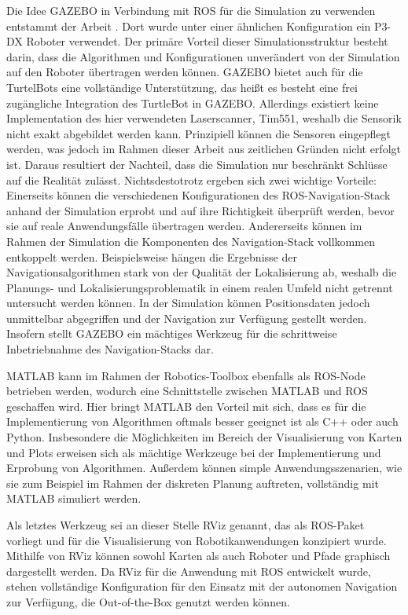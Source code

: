 Die Idee GAZEBO in Verbindung mit ROS für die Simulation zu verwenden entstammt der Arbeit \cite{ROSGazebo}. Dort wurde unter einer ähnlichen Konfiguration ein P3-DX Roboter verwendet. Der primäre Vorteil dieser Simulationsstruktur besteht darin, dass die Algorithmen und Konfigurationen unverändert von der Simulation auf den Roboter übertragen werden können. GAZEBO bietet auch für die TurtelBots eine vollständige Unterstützung, das heißt es besteht eine frei zugängliche Integration des TurtleBot in GAZEBO. Allerdings existiert keine Implementation des hier verwendeten Laserscanner, Tim551, weshalb die Sensorik nicht exakt abgebildet werden kann. Prinzipiell können die Sensoren eingepflegt werden, was jedoch im Rahmen dieser Arbeit aus zeitlichen Gründen nicht erfolgt ist. Daraus resultiert der Nachteil, dass die Simulation nur beschränkt Schlüsse auf die Realität zulässt. Nichtsdestotrotz ergeben sich zwei wichtige Vorteile: Einerseits können die verschiedenen Konfigurationen des ROS-Navigation-Stack anhand der Simulation erprobt und auf ihre Richtigkeit überprüft werden, bevor sie auf reale Anwendungsfälle übertragen werden. Andererseits können im Rahmen der Simulation die Komponenten des Navigation-Stack vollkommen entkoppelt werden. Beispielsweise hängen die Ergebnisse der Navigationsalgorithmen stark von der Qualität der Lokalisierung ab, weshalb die Planungs- und Lokalisierungsproblematik in einem realen Umfeld nicht getrennt untersucht werden können. In der Simulation können Positionsdaten jedoch unmittelbar abgegriffen und der Navigation zur Verfügung gestellt werden. Insofern stellt GAZEBO ein mächtiges Werkzeug für die schrittweise Inbetriebnahme des Navigation-Stacks dar.

MATLAB kann im Rahmen der Robotics-Toolbox ebenfalls als ROS-Node betrieben werden, wodurch eine Schnittstelle zwischen MATLAB und ROS geschaffen wird. Hier bringt MATLAB den Vorteil mit sich, dass es für die Implementierung von Algorithmen oftmals besser geeignet ist als C++ oder auch Python. Insbesondere die Möglichkeiten im Bereich der Visualisierung von Karten und Plots erweisen sich als mächtige Werkzeuge bei der Implementierung und Erprobung von Algorithmen. Außerdem können simple Anwendungsszenarien, wie sie zum Beispiel im Rahmen der diskreten Planung auftreten, vollständig mit MATLAB simuliert werden.

Als letztes Werkzeug sei an dieser Stelle RViz genannt, das als ROS-Paket vorliegt und für die Visualisierung von Robotikanwendungen konzipiert wurde. Mithilfe von RViz können sowohl Karten als auch Roboter und Pfade graphisch dargestellt werden. Da RViz für die Anwendung mit ROS entwickelt wurde, stehen vollständige Konfiguration für den Einsatz mit der autonomen Navigation zur Verfügung, die Out-of-the-Box genutzt werden können.

